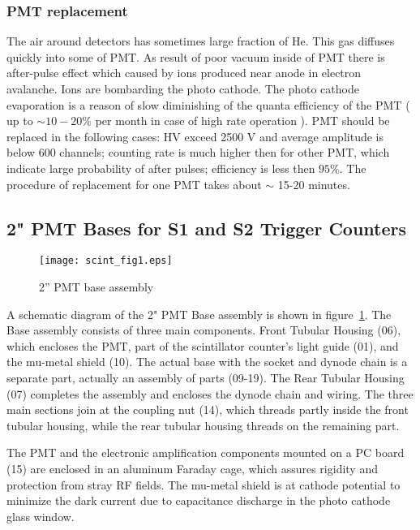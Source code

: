 \documentclass[12pt]{article}
\begin{document}
\subsubsection{PMT replacement}
The air around detectors has sometimes large fraction of He. This gas diffuses quickly 
into some of PMT. As result of poor vacuum inside of PMT there is after-pulse effect
which caused by ions produced near anode in electron avalanche. Ions are bombarding the photo 
cathode. The photo cathode evaporation is a reason of slow diminishing of the quanta efficiency 
of the PMT ( up to $\sim 10-20 \%$ per month in case of high rate operation ). 
PMT should be replaced in the following cases:
HV exceed 2500 V and average amplitude is below 600 channels; counting rate is much higher then 
for other PMT, which indicate large probability of after pulses; efficiency is less then $95\%$.
The procedure of replacement for one PMT takes about $\sim$ 15-20 minutes.

\subsection{ 2" PMT Bases for S1 and S2 Trigger Counters}

\begin{figure}
\begin{center}
\texttt{[image: scint\_fig1.eps]}
{\linespread{1.}
\caption[The 2" PMT base assembly used in S1 and S2 trigger scintillators]{2'' PMT base assembly}
\label{2''_PMT_base_assembly}}
\end{center}
\end{figure}

A schematic diagram of the 2" PMT Base assembly is shown in figure~\ref{2''_PMT_base_assembly}. 
The Base assembly consists of three main components. 
Front Tubular Housing (06), which encloses the PMT, part of the scintillator 
counter's light guide (01), and the mu-metal shield (10). The actual base with 
the socket and dynode chain is a separate part, actually an assembly of parts 
(09-19). The Rear Tubular Housing (07) completes the assembly and encloses the 
dynode chain and wiring. The three main sections join at the coupling nut (14), 
which threads partly inside the front tubular housing, while the rear tubular 
housing threads on the remaining part.

The PMT and the electronic amplification components mounted on a PC board 
(15) are enclosed in an aluminum Faraday cage, which assures rigidity and 
protection from stray RF fields. The mu-metal shield is at cathode potential to 
minimize the dark current due to capacitance discharge in the photo cathode 
glass window.
\end{document}
